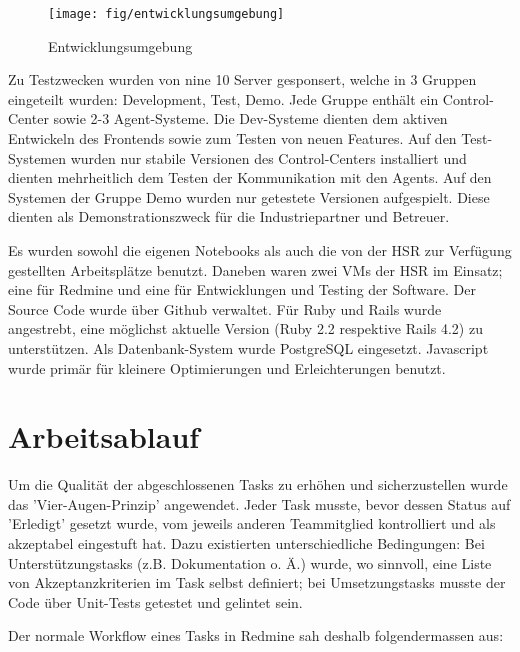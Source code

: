 \begin{figure}[H]
	\centering
	\texttt{[image: fig/entwicklungsumgebung]}
	\caption{Entwicklungsumgebung}
	\label{fig:pm:entwicklungsumgebung}
\end{figure}

Zu Testzwecken wurden von \gls{nine} 10 Server gesponsert, welche  in 3 Gruppen eingeteilt wurden: Development, Test, Demo. Jede Gruppe enthält ein Control-Center sowie 2-3 Agent-Systeme. Die Dev-Systeme dienten dem aktiven Entwickeln des Frontends sowie zum Testen von neuen Features. Auf den Test-Systemen wurden nur stabile Versionen des Control-Centers installiert und dienten mehrheitlich dem Testen der Kommunikation mit den Agents. Auf den Systemen der Gruppe Demo wurden nur getestete Versionen aufgespielt. Diese dienten als Demonstrationszweck für die Industriepartner und Betreuer.

Es wurden sowohl die eigenen Notebooks als auch die von der HSR zur Verfügung gestellten Arbeitsplätze benutzt. Daneben waren zwei VMs der HSR im Einsatz; eine für Redmine und eine für Entwicklungen und Testing der Software. Der Source Code wurde über Github verwaltet.
Für Ruby und Rails wurde angestrebt, eine möglichst aktuelle Version (Ruby 2.2 respektive Rails 4.2) zu unterstützen. Als Datenbank-System wurde PostgreSQL eingesetzt. Javascript wurde primär für kleinere Optimierungen und Erleichterungen benutzt.

\clearpage
\section{Arbeitsablauf}

Um die Qualität der abgeschlossenen Tasks zu erhöhen und sicherzustellen wurde das 'Vier-Augen-Prinzip' angewendet. Jeder Task musste, bevor dessen Status auf 'Erledigt' gesetzt wurde, vom jeweils anderen Teammitglied kontrolliert und als akzeptabel eingestuft hat. Dazu existierten unterschiedliche Bedingungen: Bei Unterstützungstasks (z.B. Dokumentation o. Ä.) wurde, wo sinnvoll, eine Liste von Akzeptanzkriterien im Task selbst definiert; bei Umsetzungstasks musste der Code über Unit-Tests getestet und gelintet sein.


Der normale Workflow eines Tasks in Redmine sah deshalb folgendermassen aus:

